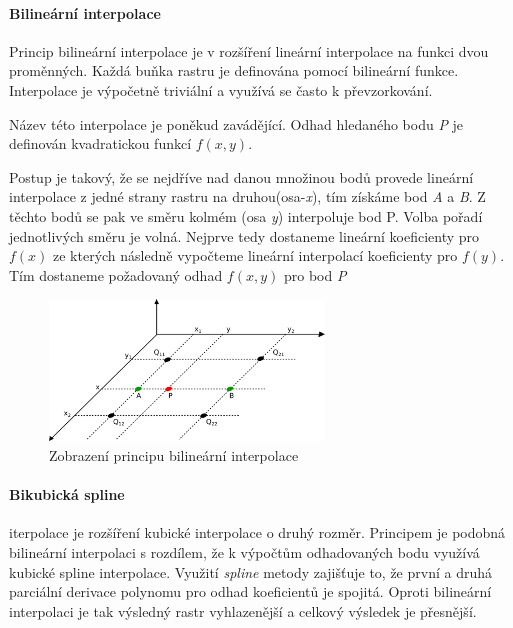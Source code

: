 \documentclass[a4paper,12pt,oneside]{report}
\begin{document}
\paragraph{Bilineární interpolace} Princip bilineární interpolace je v rozšíření lineární interpolace na funkci dvou proměnných. Každá buňka rastru je definována pomocí bilineární funkce. Interpolace je výpočetně triviální a využívá se často k převzorkování.

Název této interpolace je poněkud zavádějící. Odhad hledaného bodu \emph{P} je definován kvadratickou funkcí $f(x,y)$. 

Postup je takový, že  se nejdříve nad danou množinou bodů provede lineární interpolace z jedné strany rastru na druhou(osa-\emph{x}), tím získáme bod \emph{A} a \emph{B}. Z těchto bodů se  pak ve směru kolmém (osa \emph{y}) interpoluje bod P. Volba pořadí jednotlivých směru je volná. Nejprve tedy dostaneme lineární koeficienty pro $f(x)$ ze kterých  následně vypočteme lineární interpolací koeficienty  pro $f(y)$. Tím dostaneme požadovaný odhad $f(x,y)$  pro bod \emph{P}

\begin{figure}[h!]
    \centering
    \includegraphics[width=0.65\textwidth]{./img/interpolace/bilinear.png}
    \caption[Bilinear interpol.]{\centering  Zobrazení principu bilineární interpolace \footnotemark}
 \end{figure}   



\paragraph{Bikubická spline} iterpolace je rozšíření kubické interpolace o druhý rozměr. Principem je podobná bilineární interpolaci s rozdílem, že k výpočtům odhadovaných bodu využívá kubické spline interpolace.  Využití \textit{spline} metody zajišťuje to, že první a druhá parciální derivace polynomu pro odhad koeficientů je spojitá. Oproti bilineární interpolaci je tak výsledný rastr vyhlazenější a celkový výsledek je přesnější. \cite{bicubic}
\end{document}
